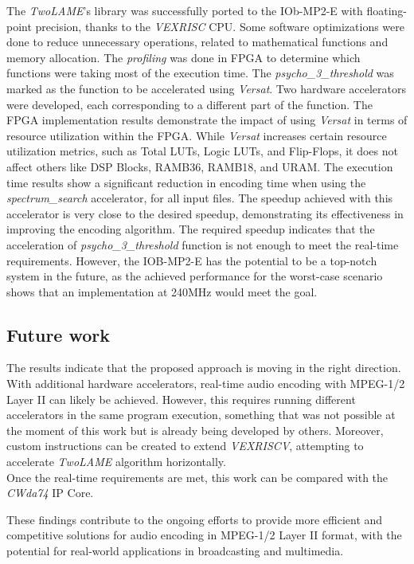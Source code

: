 The \textit{TwoLAME}'s library was successfully ported to the IOb-MP2-E with floating-point precision, thanks to the \textit{VEXRISC} CPU.
Some software optimizations were done to reduce unnecessary operations, related to mathematical functions and memory allocation.
The \textit{profiling} was done in FPGA to determine which functions were taking most of the execution time. The \textit{psycho\_3\_threshold} was marked as the function to be accelerated using \textit{Versat}.
Two hardware accelerators were developed, each corresponding to a different part of the function.
The FPGA implementation results demonstrate the impact of using \textit{Versat} in terms of resource utilization within the FPGA. While \textit{Versat} increases certain resource utilization metrics, such as Total LUTs, Logic LUTs, and Flip-Flops, it does not affect others like DSP Blocks, RAMB36, RAMB18, and URAM.
The execution time results show a significant reduction in encoding time when using the \textit{spectrum\_search} accelerator, for all input files. The speedup achieved with this accelerator is very close to the desired speedup, demonstrating its effectiveness in improving the encoding algorithm.
The required speedup indicates that the acceleration of \textit{psycho\_3\_threshold} function is not enough to meet the real-time requirements. However, the IOB-MP2-E has the potential to be a top-notch system in the future, as the achieved performance for the worst-case scenario shows that an implementation at 240MHz would meet the goal.

\subsection{Future work}

The results indicate that the proposed approach is moving in the right direction. With additional hardware accelerators, real-time audio encoding with MPEG-1/2 Layer II can likely be achieved. However, this requires running different accelerators in the same program execution, something that was not possible at the moment of this work but is already being developed by others. Moreover, custom instructions can be created to extend \textit{VEXRISCV}, attempting to accelerate \textit{TwoLAME} algorithm horizontally. \\
Once the real-time requirements are met, this work can be compared with the \textit{CWda74} IP Core.

These findings contribute to the ongoing efforts to provide more efficient and competitive solutions for audio encoding in MPEG-1/2 Layer II format, with the potential for real-world applications in broadcasting and multimedia.